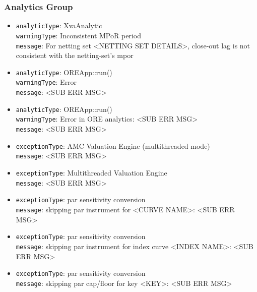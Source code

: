 \subsubsection*{Analytics Group}
\begin{itemize}


  \item \lstinline!analyticType!: XvaAnalytic \\
        \lstinline!warningType!: Inconsistent MPoR period \\
        \lstinline!message!: For netting set <NETTING SET DETAILS>, close-out lag is not consistent with the netting-set's mpor

  \item \lstinline!analyticType!: OREApp::run() \\
        \lstinline!warningType!: Error \\
        \lstinline!message!: <SUB ERR MSG>

  \item \lstinline!analyticType!: OREApp::run() \\
        \lstinline!warningType!: Error in ORE analytics: <SUB ERR MSG> \\
        \lstinline!message!: <SUB ERR MSG>

  \item \lstinline!exceptionType!: AMC Valuation Engine (multithreaded mode) \\
        \lstinline!message!: <SUB ERR MSG>

  \item \lstinline!exceptionType!: Multithreaded Valuation Engine \\
        \lstinline!message!: <SUB ERR MSG>

  \item \lstinline!exceptionType!: par sensitivity conversion \\
        \lstinline!message!: skipping par instrument for <CURVE NAME>: <SUB ERR MSG>

  \item \lstinline!exceptionType!: par sensitivity conversion \\
        \lstinline!message!: skipping par instrument for index curve <INDEX NAME>: <SUB ERR MSG>

  \item \lstinline!exceptionType!: par sensitivity conversion \\
        \lstinline!message!: skipping par cap/floor for key <KEY>: <SUB ERR MSG>


\end{itemize}
